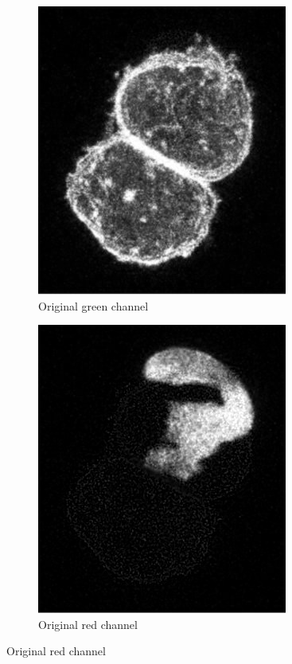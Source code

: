 \documentclass[a4paper,11pt]{ijamas}
\begin{document}
\begin{figure}[!h]
\begin{subfigure}{.48\textwidth}
  \centering
  \includegraphics[width=0.80\columnwidth]{./figs/2aG.jpg}
 \caption{Original green channel}
  \label{fig:gchannel_1_orig}
\end{subfigure}%
\begin{subfigure}{.48\textwidth}
  \centering
  \includegraphics[width=0.80\columnwidth]{./figs/2aR.jpg}
 \caption{Original red channel}
  \label{fig:rchannel_1_orig}
\end{subfigure}%


\end{figure}
\end{document}
